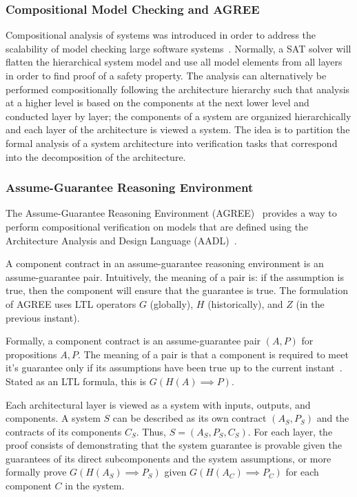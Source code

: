 \subsubsection{Compositional Model Checking and AGREE}
\label{compModelChecking}
Compositional analysis of systems was introduced in order to address the scalability of model checking large software systems~\cite{pnueli1985transition, heckel1998compositional, NFM2012:CoGaMiWhLaLu}. Normally, a SAT solver will flatten the hierarchical system model and use all model elements from all layers in order to find proof of a safety property. The analysis can alternatively be performed compositionally following the architecture hierarchy such that analysis at a higher level is based on the components at the next lower level and conducted layer by layer; the components of a system are organized hierarchically and each layer of the architecture is viewed a system. The idea is to partition the formal analysis of a system architecture into verification tasks that correspond into the decomposition of the architecture. 

\subsubsection{Assume-Guarantee Reasoning Environment}
The Assume-Guarantee Reasoning Environment (AGREE)~\cite{cofer2012compositional} provides a way to perform compositional verification on models that are defined using the Architecture Analysis and Design Language (AADL)~\cite{aerospace2012sae}. 

A component contract in an assume-guarantee reasoning environment is an assume-guarantee pair. Intuitively, the meaning of a pair is: if the assumption is true, then the component will ensure that the guarantee is true. The formulation of AGREE uses LTL operators $G$ (globally), $H$ (historically), and $Z$ (in the previous instant).

Formally, a component contract is an assume-guarantee pair $(A,P)$ for propositions $A, P$. The meaning of a pair is that a component is required to meet it's guarantee only if its assumptions have been true up to the current instant~\cite{cofer2012compositional}. Stated as an LTL formula, this is $G(H(A) \implies P)$. 

Each architectural layer is viewed as a system with inputs, outputs, and components. A system $S$ can be described as its own contract $(A_S, P_S)$ and the contracts of its components $C_S$. Thus, $S = (A_S, P_S, C_S)$. For each layer, the proof consists of demonstrating that the system guarantee is provable given the guarantees of its direct subcomponents and the system assumptions, or more formally prove $G(H(A_S) \implies P_S)$ given $G(H(A_C) \implies P_C)$ for each component $C$ in the system.  

